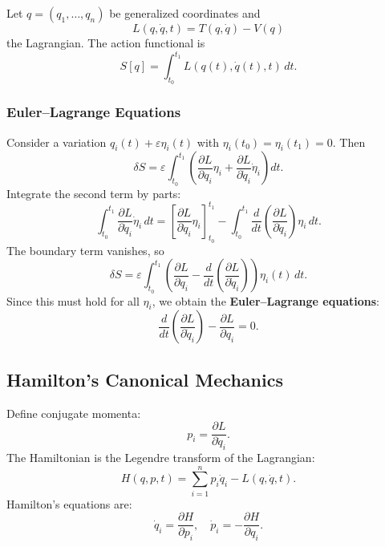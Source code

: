 \documentclass[12pt]{article}
\begin{document}
Let $q = (q_1, \ldots, q_n)$ be generalized coordinates and
\[
L(q, \dot{q}, t) = T(q, \dot{q}) - V(q)
\]
the Lagrangian.
The action functional is
\[
S[q] = \int_{t_0}^{t_1} L(q(t), \dot{q}(t), t) \, dt.
\]

\subsubsection*{Euler--Lagrange Equations}

Consider a variation $q_i(t) + \varepsilon \eta_i(t)$ with $\eta_i(t_0) = \eta_i(t_1) = 0$. Then
\[
\delta S = \varepsilon \int_{t_0}^{t_1} \left( \frac{\partial L}{\partial q_i} \eta_i + \frac{\partial L}{\partial \dot{q}_i} \dot{\eta}_i \right) dt.
\]
Integrate the second term by parts:
\[
\int_{t_0}^{t_1} \frac{\partial L}{\partial \dot{q}_i} \dot{\eta}_i \, dt = \left[ \frac{\partial L}{\partial \dot{q}_i} \eta_i \right]_{t_0}^{t_1} - \int_{t_0}^{t_1} \frac{d}{dt} \left( \frac{\partial L}{\partial \dot{q}_i} \right) \eta_i \, dt.
\]
The boundary term vanishes, so
\[
\delta S = \varepsilon \int_{t_0}^{t_1} \left( \frac{\partial L}{\partial q_i} - \frac{d}{dt} \left( \frac{\partial L}{\partial \dot{q}_i} \right) \right) \eta_i(t) \, dt.
\]
Since this must hold for all $\eta_i$, we obtain the \textbf{Euler--Lagrange equations}:
\[
\frac{d}{dt} \left( \frac{\partial L}{\partial \dot{q}_i} \right) - \frac{\partial L}{\partial q_i} = 0.
\]
%
%


\subsection*{Hamilton's Canonical Mechanics}

Define conjugate momenta:
\[
p_i = \frac{\partial L}{\partial \dot{q}_i}.
\]
The Hamiltonian is the Legendre transform of the Lagrangian:
\[
H(q, p, t) = \sum_{i=1}^n p_i \dot{q}_i - L(q, \dot{q}, t).
\]
Hamilton's equations are:
\[
\dot{q}_i = \frac{\partial H}{\partial p_i}, \quad \dot{p}_i = -\frac{\partial H}{\partial q_i}.
\]
\end{document}
